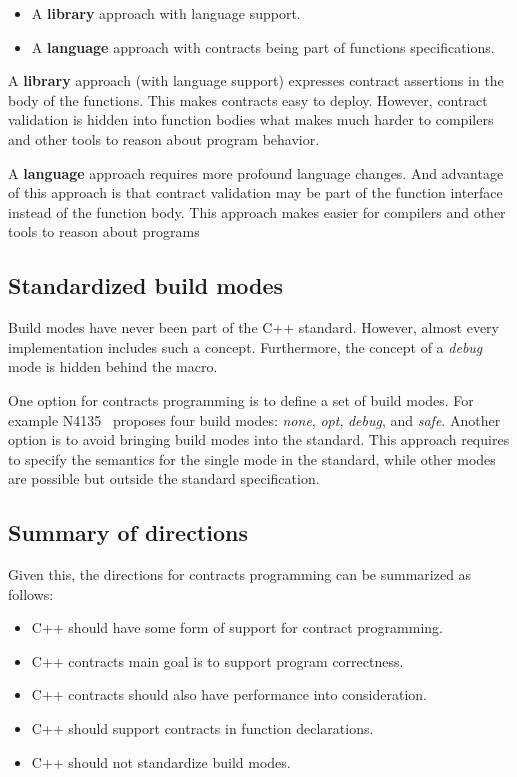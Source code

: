 \begin{itemize}
\item A \textbf{library} approach with language support.
\item A \textbf{language} approach with contracts being part of functions
specifications.
\end{itemize}

A \textbf{library} approach (with language support) expresses contract
assertions in the body of the functions. This makes contracts easy to deploy.
However, contract validation is hidden into function bodies what makes much
harder to compilers and other tools to reason about program behavior.	

A \textbf{language} approach requires more profound language changes. And
advantage of this approach is that contract validation may be part of the
function interface instead of the function body. This approach makes easier for
compilers and other tools to reason about programs


\subsection{Standardized build modes}

Build modes have never been part of the C++ standard. However, almost every
implementation includes such a concept. Furthermore, the concept of a
\emph{debug} mode is hidden behind the  macro.

One option for contracts programming is to define a set of build modes. For
example N4135~\cite{n4135} proposes four build modes: \emph{none}, \emph{opt},
\emph{debug}, and \emph{safe}. Another option is to avoid bringing build modes
into the standard. This approach requires to specify the semantics for the
single mode in the standard, while other modes are possible but outside the
standard specification.


\subsection{Summary of directions}

Given this, the directions for contracts programming can be summarized as
follows:

\begin{itemize}
\item C++ should have some form of support for contract programming.
\item C++ contracts main goal is to support program correctness.
\item C++ contracts should also have performance into consideration.
\item C++ should support contracts in function declarations.
\item C++ should not standardize build modes.
\end{itemize}
